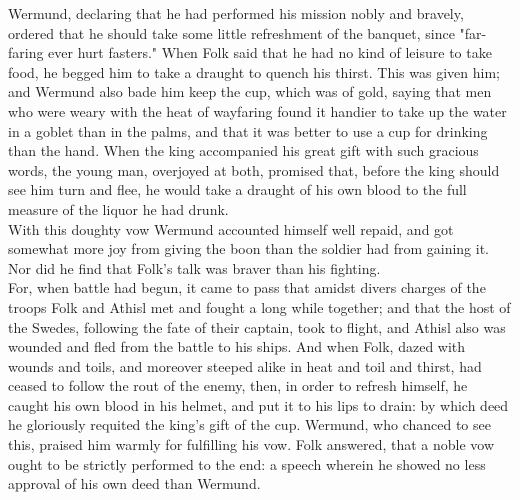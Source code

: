 \documentclass[10pt,a4paper]{report}
\begin{document}
Wermund, declaring that he had performed his mission nobly and bravely, ordered that he should take some little refreshment of the banquet, since "far-faring ever hurt fasters." When Folk said that he had no kind of leisure to take food, he begged him to take a draught to quench his thirst. This was given him; and Wermund also bade him keep the cup, which was of gold, saying that men who were weary with the heat of wayfaring found it handier to take up the water in a goblet than in the palms, and that it was better to use a cup for drinking than the hand. When the king accompanied his great gift with such gracious words, the young man, overjoyed at both, promised that, before the king should see him turn and flee, he would take a draught of his own blood to the full measure of the liquor he had drunk.\\

With this doughty vow Wermund accounted himself well repaid, and got somewhat more joy from giving the boon than the soldier had from gaining it. Nor did he find that Folk's talk was braver than his fighting.\\

For, when battle had begun, it came to pass that amidst divers charges of the troops Folk and Athisl met and fought a long while together; and that the host of the Swedes, following the fate of their captain, took to flight, and Athisl also was wounded and fled from the battle to his ships. And when Folk, dazed with wounds and toils, and moreover steeped alike in heat and toil and thirst, had ceased to follow the rout of the enemy, then, in order to refresh himself, he caught his own blood in his helmet, and put it to his lips to drain: by which deed he gloriously requited the king's gift of the cup. Wermund, who chanced to see this, praised him warmly for fulfilling his vow. Folk answered, that a noble vow ought to be strictly performed to the end: a speech wherein he showed no less approval of his own deed than Wermund.\\
\end{document}
